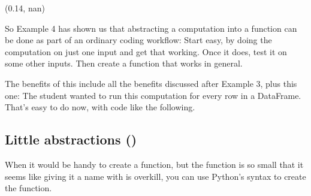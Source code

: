 \documentclass[letterpaper,10pt,english]{jupyterBook}
\begin{document}
\begin{sphinxVerbatim}[commandchars=\\\{\}]
     
\end{sphinxVerbatim}

\begin{sphinxVerbatim}[commandchars=\\\{\}]
(0.14, nan)
\end{sphinxVerbatim}

\sphinxAtStartPar
So Example 4 has shown us that abstracting a computation into a function can be done as part of an ordinary coding workflow:  Start easy, by doing the computation on just one input and get that working.  Once it does, test it on some other inputs.  Then create a function that works in general.

\sphinxAtStartPar
The benefits of this include all the benefits discussed after Example 3, plus this one:  The student wanted to run this computation for every row in a DataFrame.  That’s easy to do now, with code like the following.

\begin{sphinxVerbatim}[commandchars=\\\{\}]
\PYG{p}{[}\PYG{p}{]}  \PYG{p}{[}\PYG{p}{]}  
\PYG{p}{[}\PYG{p}{]}  \PYG{p}{[}\PYG{p}{]}  
\end{sphinxVerbatim}


\subsection{Little abstractions ()}
\label{\detokenize{chapter-7-abstraction:little-abstractions-lambda}}
\sphinxAtStartPar
When it would be handy to create a function, but the function is so small that it seems like giving it a name with  is overkill, you can use Python’s  syntax to create the function.
\end{document}
